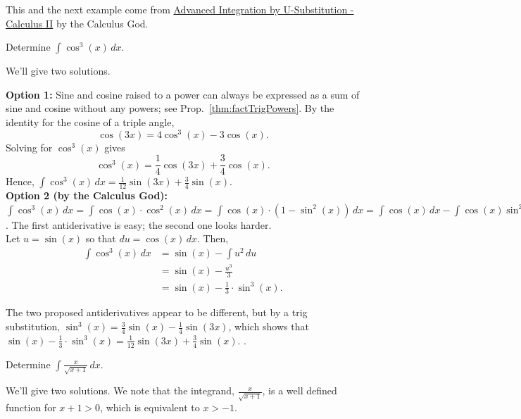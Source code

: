 This and the next example come from \href{https://youtu.be/F_atWR7LFi0}{Advanced Integration by U-Substitution - Calculus II} by the Calculus God. 

\begin{example} 
Determine $\int \cos^3(x) \, dx$.    
\end{example}

\solution We'll give two solutions.

\textbf{Option 1:} Sine and cosine raised to a power can always be expressed as a sum of sine and cosine without any powers; see Prop.~\ref{thm:factTrigPowers}. By the identity for the cosine of a triple angle, 
\[ \cos(3x) = 4\cos^3(x) - 3\cos(x). \]
Solving for \( \cos^3(x) \) gives
\[ \cos^3(x) = \frac{1}{4}\cos(3x) + \frac{3}{4}\cos(x). \]
Hence, $\int \cos^3(x) \, dx = \frac{1}{12} \sin(3x) + \frac{3}{4} \sin(x)$.\\


\textbf{Option 2 (by the Calculus God):} $\int \cos^3(x) \, dx = \int \cos(x) \cdot \cos^2(x) \, dx = \int \cos(x) \cdot \left( 1 - \sin^2(x) \right) \, dx = \int \cos(x) \, dx - \int \cos(x) \sin^2(x) \, dx$. The first antiderivative is easy; the second one looks harder.\\

Let \( u = \sin(x) \) so that $du = \cos(x) \, dx$.  Then,
\begin{align*}
    \int \cos^3(x) \, dx &= \sin(x) - \int u^2 \, du \\
    &= \sin(x) - \frac{u^3}{3} \\
    &= \sin(x) - \frac{1}{3} \cdot \sin^3(x).
\end{align*}

The two proposed antiderivatives appear to be different, but by a trig substitution, $\sin^3(x) = \frac{3}{4}\sin(x) - \frac{1}{4}\sin(3x)$, which shows that $ \sin(x) - \frac{1}{3} \cdot \sin^3(x) = \frac{1}{12} \sin(3x) + \frac{3}{4} \sin(x)$. 
\Qed.

\bigskip

\begin{example} 
Determine $\int \frac{x}{\sqrt{x+1}} \, dx$.    
\end{example}

\solution We'll give two solutions. We note that the integrand, $\frac{x}{\sqrt{x+1}}$, is a well defined function for $x+1 > 0$, which is equivalent to $x > -1$.

